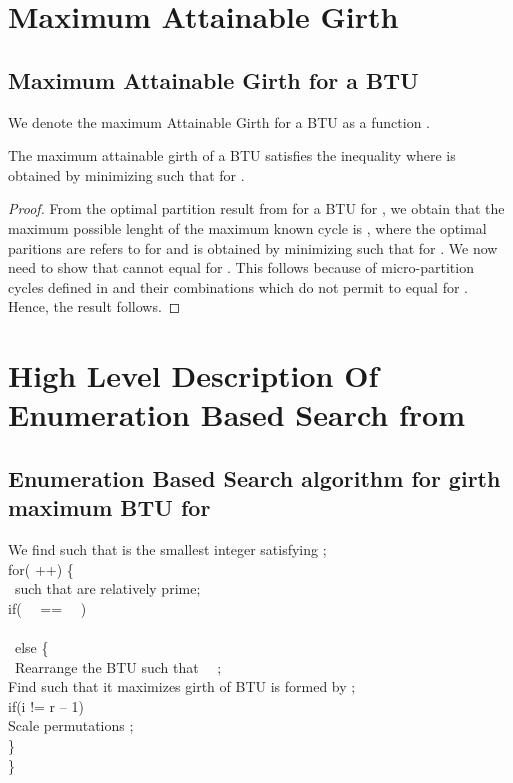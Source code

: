 \documentclass{llncs}
\begin{document}
\section{Maximum Attainable Girth}
\subsection {Maximum Attainable Girth for a  BTU}
We denote the maximum Attainable Girth for a  BTU as a function  .

\begin{theorem}
The maximum attainable girth of a    BTU satisfies the inequality    where    is obtained by minimizing    such that   for  .
\end{theorem}
\begin{proof}
From the optimal partition result from  for a  BTU for , we obtain that the maximum possible lenght of the maximum known cycle is , where the optimal paritions are { refers to }  {for }  and  is obtained by minimizing   such that   for . We now need to show that  cannot equal  for . This follows because of micro-partition cycles defined in  and their combinations which do not permit  to equal  for . Hence, the result follows.
\end{proof} 

\section {High Level Description Of Enumeration Based Search from }
\subsection{Enumeration Based Search algorithm for girth maximum  BTU for\ } 
We find  such that  is the smallest integer satisfying ; \\
for(  ++) \{ \\
\   such that  are relatively prime; \\
if(  \ \ == \   \ ) \\
  \\
\ else \{ \\
\ Rearrange the  BTU such that \ \  ; \\
Find  such that it maximizes girth of   BTU is formed by  ; \\
if(i != r -- 1) \\
Scale permutations ; \\
\} \\
\}
\end{document}
